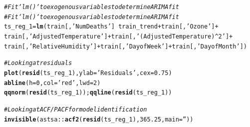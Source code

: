 \documentclass{article}\usepackage[]{graphicx}\usepackage[]{color}
\makeatletter
\newcommand{\hlnum}[1]{\textcolor[rgb]{0.686,0.059,0.569}{#1}}%
\newcommand{\hlstr}[1]{\textcolor[rgb]{0.192,0.494,0.8}{#1}}%
\newcommand{\hlcom}[1]{\textcolor[rgb]{0.678,0.584,0.686}{\textit{#1}}}%
\newcommand{\hlopt}[1]{\textcolor[rgb]{0,0,0}{#1}}%
\newcommand{\hlstd}[1]{\textcolor[rgb]{0.345,0.345,0.345}{#1}}%
\newcommand{\hlkwb}[1]{\textcolor[rgb]{0.69,0.353,0.396}{#1}}%
\newcommand{\hlkwc}[1]{\textcolor[rgb]{0.333,0.667,0.333}{#1}}%
\newcommand{\hlkwd}[1]{\textcolor[rgb]{0.737,0.353,0.396}{\textbf{#1}}}%
\newenvironment{kframe}{%
 \def\at@end@of@kframe{}%
 \ifinner\ifhmode%
  \def\at@end@of@kframe{\end{minipage}}%
  \begin{minipage}{\columnwidth}%
 \fi\fi%
 \def\FrameCommand##1{\hskip\@totalleftmargin \hskip-\fboxsep
 \colorbox{shadecolor}{##1}\hskip-\fboxsep
     \hskip-\linewidth \hskip-\@totalleftmargin \hskip\columnwidth}%
 \MakeFramed {\advance\hsize-\width
   \@totalleftmargin\z@ \linewidth\hsize
   \@setminipage}}%
 {\par\unskip\endMakeFramed%
 \at@end@of@kframe}
\newenvironment{knitrout}{}{} %
\makeatother
\begin{document}
\begin{knitrout}
\color{fgcolor}\begin{kframe}
\begin{alltt}
\hlcom{# Fit `lm()` to exogenous variables to determine ARIMA fit}
\hlcom{# Fit `lm()` to exogenous variables to determine ARIMA fit}
\hlstd{ts_reg_1} \hlkwb{=} \hlkwd{lm}\hlstd{(train[,}\hlstr{'Num Deaths'}\hlstd{]} \hlopt{~} \hlstd{train_trend} \hlopt{+} \hlstd{train[,}\hlstr{'Ozone'}\hlstd{]} \hlopt{+}
  \hlstd{train[,}\hlstr{'Adjusted Temperature'}\hlstd{]} \hlopt{+} \hlstd{train[,}\hlstr{'(Adjusted Temperature)^2'}\hlstd{]} \hlopt{+}
  \hlstd{train[,}\hlstr{'Relative Humidity'}\hlstd{]} \hlopt{+} \hlstd{train[,}\hlstr{'Day of Week'}\hlstd{]} \hlopt{+} \hlstd{train[,}\hlstr{'Day of Month'}\hlstd{])}

\hlcom{# Looking at residuals}
\hlkwd{plot}\hlstd{(}\hlkwd{resid}\hlstd{(ts_reg_1),} \hlkwc{ylab}\hlstd{=}\hlstr{'Residuals'}\hlstd{,} \hlkwc{cex}\hlstd{=}\hlnum{0.75}\hlstd{)}
\hlkwd{abline}\hlstd{(}\hlkwc{h}\hlstd{=}\hlnum{0}\hlstd{,} \hlkwc{col}\hlstd{=}\hlstr{'red'}\hlstd{,} \hlkwc{lwd}\hlstd{=}\hlnum{2}\hlstd{)}
\hlkwd{qqnorm}\hlstd{(}\hlkwd{resid}\hlstd{(ts_reg_1));} \hlkwd{qqline}\hlstd{(}\hlkwd{resid}\hlstd{(ts_reg_1))}
\end{alltt}
\end{kframe}
\end{knitrout}
\begin{knitrout}
\color{fgcolor}\begin{kframe}
\begin{alltt}
\hlcom{# Looking at ACF/PACF for model identification}
\hlkwd{invisible}\hlstd{(astsa}\hlopt{::}\hlkwd{acf2}\hlstd{(}\hlkwd{resid}\hlstd{(ts_reg_1),} \hlnum{365.25}\hlstd{,} \hlkwc{main}\hlstd{=}\hlstr{''}\hlstd{))}
\end{alltt}
\end{kframe}
\end{knitrout}
\end{document}
